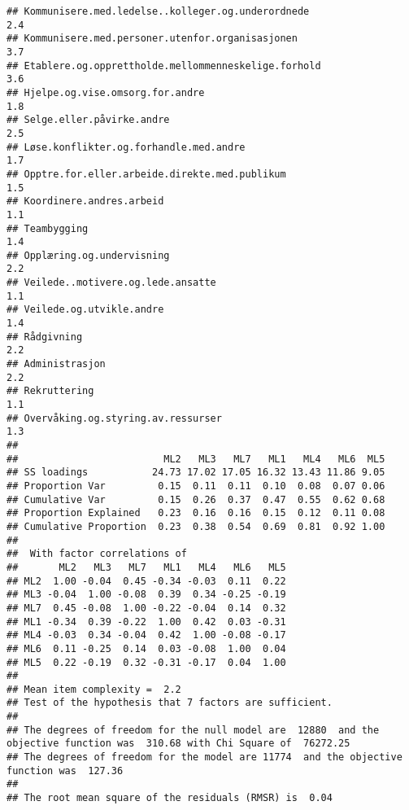 \documentclass[
]{article}
\begin{document}
\begin{verbatim}
## Kommunisere.med.ledelse..kolleger.og.underordnede                                2.4
## Kommunisere.med.personer.utenfor.organisasjonen                                  3.7
## Etablere.og.opprettholde.mellommenneskelige.forhold                              3.6
## Hjelpe.og.vise.omsorg.for.andre                                                  1.8
## Selge.eller.påvirke.andre                                                        2.5
## Løse.konflikter.og.forhandle.med.andre                                           1.7
## Opptre.for.eller.arbeide.direkte.med.publikum                                    1.5
## Koordinere.andres.arbeid                                                         1.1
## Teambygging                                                                      1.4
## Opplæring.og.undervisning                                                        2.2
## Veilede..motivere.og.lede.ansatte                                                1.1
## Veilede.og.utvikle.andre                                                         1.4
## Rådgivning                                                                       2.2
## Administrasjon                                                                   2.2
## Rekruttering                                                                     1.1
## Overvåking.og.styring.av.ressurser                                               1.3
## 
##                         ML2   ML3   ML7   ML1   ML4   ML6  ML5
## SS loadings           24.73 17.02 17.05 16.32 13.43 11.86 9.05
## Proportion Var         0.15  0.11  0.11  0.10  0.08  0.07 0.06
## Cumulative Var         0.15  0.26  0.37  0.47  0.55  0.62 0.68
## Proportion Explained   0.23  0.16  0.16  0.15  0.12  0.11 0.08
## Cumulative Proportion  0.23  0.38  0.54  0.69  0.81  0.92 1.00
## 
##  With factor correlations of 
##       ML2   ML3   ML7   ML1   ML4   ML6   ML5
## ML2  1.00 -0.04  0.45 -0.34 -0.03  0.11  0.22
## ML3 -0.04  1.00 -0.08  0.39  0.34 -0.25 -0.19
## ML7  0.45 -0.08  1.00 -0.22 -0.04  0.14  0.32
## ML1 -0.34  0.39 -0.22  1.00  0.42  0.03 -0.31
## ML4 -0.03  0.34 -0.04  0.42  1.00 -0.08 -0.17
## ML6  0.11 -0.25  0.14  0.03 -0.08  1.00  0.04
## ML5  0.22 -0.19  0.32 -0.31 -0.17  0.04  1.00
## 
## Mean item complexity =  2.2
## Test of the hypothesis that 7 factors are sufficient.
## 
## The degrees of freedom for the null model are  12880  and the objective function was  310.68 with Chi Square of  76272.25
## The degrees of freedom for the model are 11774  and the objective function was  127.36 
## 
## The root mean square of the residuals (RMSR) is  0.04 

\end{verbatim}
\end{document}
